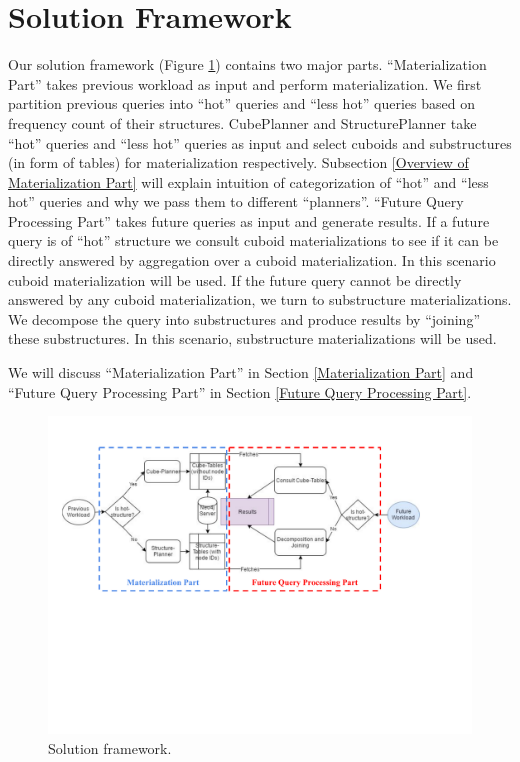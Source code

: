 




\section{Solution Framework}

Our solution framework (Figure \ref{Solution framework}) contains two major parts. ``Materialization Part'' takes previous workload as input and perform materialization. We first partition previous queries into ``hot'' queries and ``less hot'' queries based on frequency count of their structures. CubePlanner and StructurePlanner take ``hot'' queries and ``less hot'' queries as input and select cuboids and substructures (in form of tables) for materialization respectively. Subsection \ref{Overview of Materialization Part} will explain intuition of categorization of ``hot'' and ``less hot'' queries and why we pass them to different ``planners''.  ``Future Query Processing Part'' takes future queries as input and generate results. If a future query is of ``hot'' structure we consult cuboid materializations to see if it can be directly answered by aggregation over a cuboid materialization. In this scenario cuboid materialization will be used. If the future query cannot be directly answered by any cuboid materialization, we turn to substructure materializations. We decompose the query into substructures and produce results by ``joining'' these substructures. In this scenario, substructure materializations will be used. 

We will discuss ``Materialization Part'' in Section \ref{Materialization Part} and ``Future Query Processing Part'' in Section \ref{Future Query Processing Part}.

\begin {figure}[H]
\centering
\includegraphics[scale=0.8]{pic/41.pdf}
\caption{Solution framework.}
\label{Solution framework}
\end{figure}


